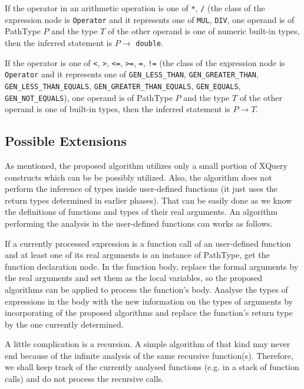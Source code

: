 If the operator in an arithmetic operation is one of \texttt{*}, \texttt{/} (the class of the expression node is \texttt{Operator} and it represents one of \texttt{MUL}, \texttt{DIV}, one operand is of PathType $P$ and the type $T$ of the other operand is one of numeric built-in types, then the inferred statement is $P \rightarrow $ \texttt{double}.

If the operator is one of \texttt{<}, \texttt{>}, \texttt{<=}, \texttt{>=}, \texttt{=}, \texttt{!=} (the class of the expression node is \texttt{Operator} and it represents one of \texttt{GEN\_LESS\_THAN}, \texttt{GEN\_GREATER\_THAN}, \texttt{GEN\_LESS\_THAN\_EQUALS}, \texttt{GEN\_GREATER\_THAN\_EQUALS}, \texttt{GEN\_EQUALS}, \\ \texttt{GEN\_NOT\_EQUALS}), one operand is of PathType $P$ and the type $T$ of the other operand is one of built-in types, then the inferred statement is $P \rightarrow T$.

\subsection{Possible Extensions}
As mentioned, the proposed algorithm utilizes only a small portion of XQuery constructs which can be be possibly utilized. Also, the algorithm does not perform the inference of types inside user-defined functions (it just uses the return types determined in earlier phases). That can be easily done as we know the definitions of functions and types of their real arguments. An algorithm performing the analysis in the user-defined functions can works as follows.

If a currently processed expression is a function call of an user-defined function and at least one of its real arguments is an instance of PathType, get the function declaration node. In the function body, replace the formal arguments by the real arguments and set them as the local variables, so the proposed algorithms can be applied to process the function's body. Analyse the types of expressions in the body with the new information on the types of arguments by incorporating of the proposed algorithms and replace the function's return type by the one currently determined.

A little complication is a recursion. A simple algorithm of that kind may never end because of the infinite analysis of the same recursive function(s). Therefore, we shall keep track of the currently analysed functions (e.g. in a stack of function calls) and do not process the recursive calls. 


